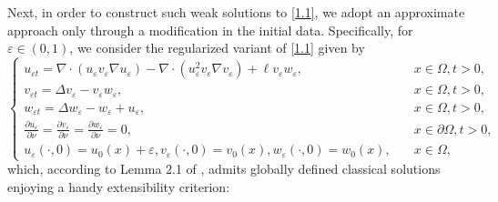\documentclass[12pt]{article}
\theoremstyle{plain}
\theoremstyle{definition}
\numberwithin{equation}{section}
\begin{document}
Next, in order to construct such  weak solutions to \eqref{1.1}, we adopt an approximate approach only through a modification in the initial data. %
Specifically, for $\varepsilon\in(0,1)$, we consider the regularized variant of \eqref{1.1} given by
\begin{equation}\label{2.5}
    \left\{\begin{array}{ll}
         u_{\varepsilon t}=\nabla\cdot(u_\varepsilon v_\varepsilon \nabla u_\varepsilon )-\nabla\cdot(u_\varepsilon ^2v_\varepsilon \nabla v_\varepsilon )+\ell v_\varepsilon w_\varepsilon ,& \quad x\in\Omega, t>0,\\
		v_{\varepsilon t}=\Delta v_\varepsilon -v_\varepsilon w_\varepsilon ,&\quad x\in\Omega, t>0,\\
		w_{\varepsilon t}=\Delta w_\varepsilon -w_\varepsilon +u_\varepsilon ,&\quad x\in\Omega, t>0,\\
	\frac{\partial u_\varepsilon}{\partial\nu}=\frac{\partial v_\varepsilon}{\partial\nu}=\frac{\partial w_\varepsilon}{\partial\nu}=0,
&\quad x\in\partial\Omega, t>0,\\
		u_\varepsilon (\cdot,0)=u_{0}(x)+\varepsilon ,v_\varepsilon (\cdot,0)=v_{0}(x),w_\varepsilon (\cdot,0)=w_{0}(x),&\quad x\in\Omega,
    \end{array}
    \right.
\end{equation}
which, according to Lemma 2.1 of \cite{WNARWA}, admits globally defined classical solutions enjoying  a handy extensibility  criterion: %
\end{document}

